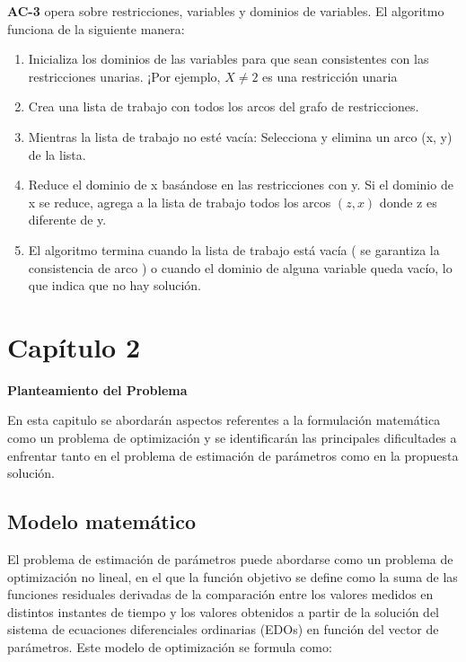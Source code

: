 \documentclass{article}
\begin{document}
\textbf{AC-3} opera sobre restricciones, variables y dominios de variables. El algoritmo funciona de la siguiente manera:

\begin{enumerate}
    \item Inicializa los dominios de las variables para que sean consistentes con las restricciones unarias. ¡Por ejemplo, $X \neq 2$ es una restricción unaria
    \item Crea una lista de trabajo con todos los arcos del grafo de restricciones. 
    \item  Mientras la lista de trabajo no esté vacía: Selecciona y elimina un arco (x, y) de la lista.
    \item Reduce el dominio de x basándose en las restricciones con y. Si el dominio de x se reduce, agrega a la lista de trabajo todos los arcos $(z, x)$ donde z es diferente de y.
    \item El algoritmo termina cuando la lista de trabajo está vacía ( se garantiza la consistencia de arco ) o cuando el dominio de alguna variable queda vacío, lo que indica que no hay solución.

\end{enumerate}
\newpage

\section*{ \Huge Capítulo 2 }
    \large \textbf{ Planteamiento del Problema  }\\
    \label{sec:14} 

        En esta capitulo se abordarán aspectos referentes a la formulación matemática como un problema de optimización y se identificarán las principales dificultades a enfrentar tanto en el problema de estimación de parámetros como en la propuesta solución.
    
        \subsection*{\Large Modelo matemático}   

        El problema de estimación de parámetros puede abordarse como un problema de optimización no lineal, en el que la función objetivo se define como la suma de las funciones residuales derivadas de la comparación entre los valores medidos en distintos instantes de tiempo y los valores obtenidos a partir de la solución del sistema de ecuaciones diferenciales ordinarias (EDOs) en función del vector de parámetros. Este modelo de optimización se formula como:
\end{document}

